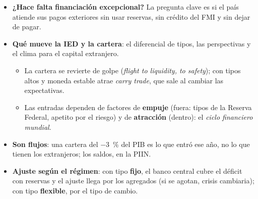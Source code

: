 \documentclass{article}
\begin{document}
\begin{columnas}
\begin{itemize}[itemsep=1.5pt]
\item \textbf{¿Hace falta financiación excepcional?} La pregunta clave es si el país atiende sus pagos exteriores sin usar reservas, sin crédito del FMI y sin dejar de pagar.
\item \textbf{Qué mueve la IED y la cartera}: el diferencial de tipos, las perspectivas y el clima para el capital extranjero.
  \begin{itemize}
  \item La cartera se revierte de golpe (\emph{flight to liquidity, to safety}); con tipos altos y moneda estable atrae \emph{carry trade}, que sale al cambiar las expectativas.
  \item Las entradas dependen de factores de \textbf{empuje} (fuera: tipos de la Reserva Federal, apetito por el riesgo) y de \textbf{atracción} (dentro): el \emph{ciclo financiero mundial}.
  \end{itemize}
\item \textbf{Son flujos}: una cartera del $-3$~\% del PIB es lo que entró ese año, no lo que tienen los extranjeros; los saldos, en la PIIN.
\item \textbf{Ajuste según el régimen}: con tipo \textbf{fijo}, el banco central cubre el déficit con reservas y el ajuste llega por los agregados (si se agotan, crisis cambiaria); con tipo \textbf{flexible}, por el tipo de cambio.
\end{itemize}


\end{columnas}
\end{document}
